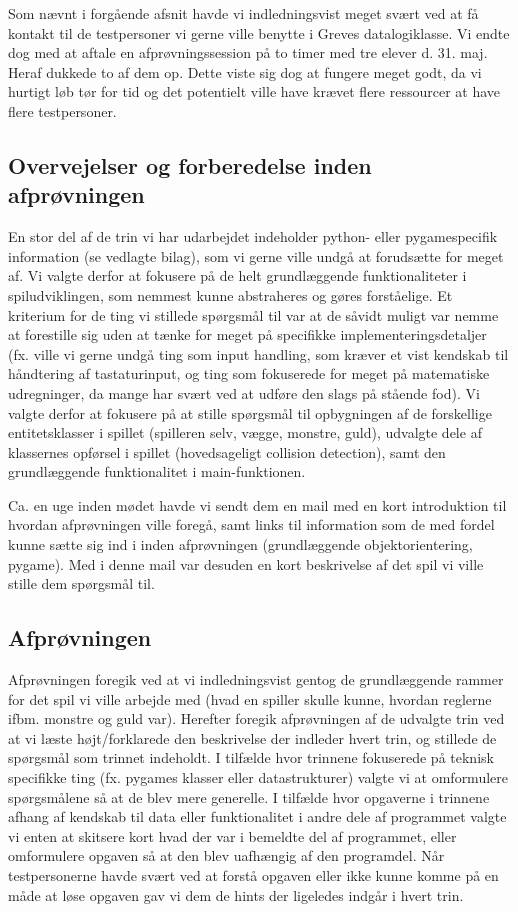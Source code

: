 \documentclass[10pt,a4paper,danish]{article}
\begin{document}
Som nævnt i forgående afsnit havde vi indledningsvist meget svært ved at få kontakt til de 
testpersoner vi gerne ville benytte i Greves datalogiklasse. Vi endte dog med at aftale en 
afprøvningssession på to timer med tre elever d. 31. maj. Heraf dukkede to af dem op. Dette viste sig dog
at fungere meget godt, da vi hurtigt løb tør for tid og det potentielt ville have krævet flere ressourcer
at have flere testpersoner.

\subsection{Overvejelser og forberedelse inden afprøvningen}
En stor del af de trin vi har udarbejdet indeholder python- eller pygamespecifik information (se vedlagte bilag), som 
vi gerne ville undgå at forudsætte for meget af. Vi valgte derfor at fokusere på de helt 
grundlæggende funktionaliteter i spiludviklingen, som nemmest kunne abstraheres og gøres forståelige.
Et kriterium for de ting vi stillede spørgsmål til var at de såvidt muligt var nemme at
forestille sig uden at tænke for meget på specifikke implementeringsdetaljer (fx. ville vi gerne undgå
ting som input handling, som kræver et vist kendskab til håndtering af tastaturinput, og ting som 
fokuserede for meget på matematiske udregninger, da mange har svært ved at udføre den slags på stående fod). 
Vi valgte derfor at fokusere på at stille spørgsmål til opbygningen af de forskellige entitetsklasser i spillet
(spilleren selv, vægge, monstre, guld), udvalgte dele af klassernes opførsel i spillet (hovedsageligt collision
detection), samt den grundlæggende funktionalitet i main-funktionen. 

Ca. en uge inden mødet havde vi sendt dem en mail med en kort introduktion til hvordan afprøvningen 
ville foregå, samt links til information som de med fordel kunne sætte sig ind i inden afprøvningen 
(grundlæggende objektorientering, pygame). Med i denne mail var desuden en kort beskrivelse af det spil
vi ville stille dem spørgsmål til. 

\subsection{Afprøvningen}
Afprøvningen foregik ved at vi indledningsvist gentog de grundlæggende rammer for det
spil vi ville arbejde med (hvad en spiller skulle kunne, 
hvordan reglerne ifbm. monstre og guld var). Herefter foregik afprøvningen af de
udvalgte trin ved at vi læste højt/forklarede den beskrivelse der indleder hvert 
trin, og stillede de spørgsmål som trinnet indeholdt. I tilfælde hvor trinnene
fokuserede på teknisk specifikke ting (fx. pygames klasser eller datastrukturer) 
valgte vi at omformulere spørgsmålene så at de blev mere generelle. I tilfælde hvor 
opgaverne i trinnene afhang af kendskab til data eller funktionalitet i andre dele 
af programmet valgte vi enten at skitsere kort hvad der var i bemeldte del af programmet, 
eller omformulere opgaven så at den blev uafhængig af den programdel. Når testpersonerne havde
svært ved at forstå opgaven eller ikke kunne komme på en måde at løse opgaven
gav vi dem de hints der ligeledes indgår i hvert trin. 
\end{document}
